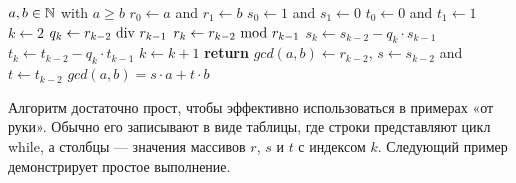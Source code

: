 \begin{algorithm}\caption{Расширенный алгоритм Евклида}
\label{alg_ext_euclid_alg}
\begin{algorithmic}[0]
\Require $a,b \in \mathbb{N}$ with $a\geq b$
\State $r_0\gets a$ and $r_1\gets b$
\State $s_0\gets 1$ and $s_1\gets 0$
\State $t_0\gets 0$ and $t_1\gets 1$
\State $k\gets 2$
\State $ q_k\gets r_{k-2} \text{ div } r_{k-1} $
\State $ r_{k}\gets r_{k-2} \text{ mod } r_{k-1} $
\State $ s_{k}\gets s_{k-2} -q_k \cdot s_{k-1} $
\State $ t_{k}\gets t_{k-2} -q_k \cdot t_{k-1} $
\State $ k \gets k + 1 $
\EndWhile
\State \textbf{return} $gcd(a,b)\gets r_{k-2}$, $s\gets s_{k-2}$ and $ t \gets t_{k-2} $
\EndProcedure
\Ensure $ gcd (a, b) = s \cdot a + t \cdot b $
\end{algorithmic}
\end{algorithm}
Алгоритм достаточно прост, чтобы эффективно использоваться в примерах «от руки». Обычно его записывают в виде таблицы, где строки представляют цикл while, а столбцы — значения массивов $r$, $s$ и $t$ с индексом $k$. Следующий пример демонстрирует простое выполнение.
